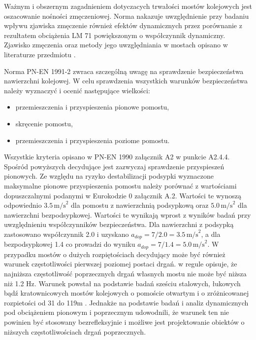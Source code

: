 Ważnym i obszernym zagadnieniem dotyczacych trwałości mostów kolejowych jest oszacowanie nośności zmęczeniowej. Norma nakazuje uwzględnienie przy badaniu wpływu zjawiska zmęczenie również efektów dynamicznych przez porównanie z rezultatem obciążenia LM 71 powiększonym o współczynnik dynamiczny. Zjawisko zmęczenia oraz metody jego uwzględniania w mostach opisano w literaturze przedmiotu \parencite{Kocanda1985,Schijve2001,Malm2006,Siwowski2012,Siwowski2014,Szafranski2017}.


Norma PN-EN 1991-2 zwraca szczególną uwagę na sprawdzenie bezpieczeństwa nawierzchni kolejowej. W celu sprawdzenia wszystkich warunków bezpieczeństwa należy wyznaczyć i ocenić następujące wielkości:
\begin{itemize}[noitemsep]
	\item przemieszczenia i przyspieszenia pionowe pomostu,
	\item skręcenie pomostu,
	\item przemieszczenia i przyspieszenia poziome pomostu.
\end{itemize}
Wszystkie kryteria opisano w PN-EN 1990 załącznik A2 w punkcie A2.4.4. Spośród powyższych decydujące jest zazwyczaj sprawdzenie przyspieszeń pionowych. Ze względu na ryzyko destabilizacji podsypki wyznaczone maksymalne pionowe przyspieszenia pomostu należy porównać z wartościami dopuszczalnymi podanymi w Eurokodzie 0 załącznik A.2. Wartości te wynoszą odpowiednio $3.5\,\text{m/s}^2$ dla pomostu z nawierzchnią podsypkową oraz $5.0 \,\text{m/s}^2$ dla nawierzchni bezpodsypkowej. Wartości te wynikają wprost z wyników badań \parencite{Zacher2008} przy uwzględnieniu współczynników bezpieczeństwa. Dla nawierzchni z podsypką zastosowano współczynnik 2.0 i uzyskano $a_{dop}=7/2.0=3.5\,\text{m/s}^2$, a dla bezpodsypkowej 1.4 co prowadzi do wyniku $a_{dop}=7/1.4=5.0\,\text{m/s}^2$.
W przypadku mostów o dużych rozpiętościach decydujący może być również warunek częstotliwości pierwszej poziomej postaci drgań. \cite{PKNc} w regule opisuje, że najniższa częstotliwość poprzecznych drgań własnych mostu nie może być niższa niż 1.2 Hz. Warunek powstał na podstawie badań sześciu stalowych, łukowych bądź kratownicowych mostów kolejowych o pomoście otwartym i o zróżnicowanej rozpietości od 31 do 119m \parencite{ERRI1996}. Jednakże \cite{Dias2008} na podstawie badań i analiz dynamicznych pod obciążeniem pionowym i poprzecznym udowodnili, że warunek ten nie powinien być stosowany bezrefleksyjnie i możliwe jest projektowanie obiektów o niższych częstotliwościach drgań poprzecznych.

